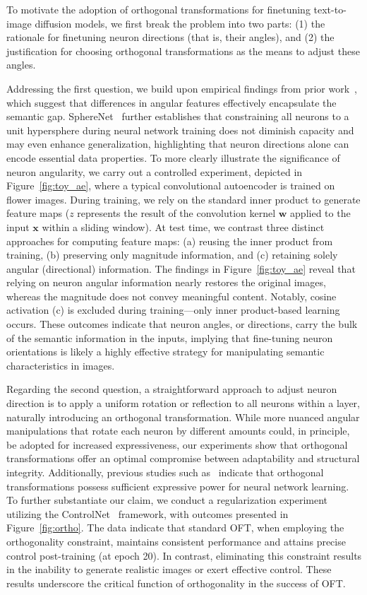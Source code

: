 To motivate the adoption of orthogonal transformations for finetuning text-to-image diffusion models, we first break the problem into two parts: (1) the rationale for finetuning neuron directions (that is, their angles), and (2) the justification for choosing orthogonal transformations as the means to adjust these angles.

Addressing the first question, we build upon empirical findings from prior work~\cite{liu2018decoupled,chen2020angular}, which suggest that differences in angular features effectively encapsulate the semantic gap. SphereNet~\cite{liu2017deep} further establishes that constraining all neurons to a unit hypersphere during neural network training does not diminish capacity and may even enhance generalization, highlighting that neuron directions alone can encode essential data properties. To more clearly illustrate the significance of neuron angularity, we carry out a controlled experiment, depicted in Figure~\ref{fig:toy_ae}, where a typical convolutional autoencoder is trained on flower images. During training, we rely on the standard inner product to generate feature maps ($z$ represents the result of the convolution kernel $\bm{w}$ applied to the input $\bm{x}$ within a sliding window). At test time, we contrast three distinct approaches for computing feature maps: (a) reusing the inner product from training, (b) preserving only magnitude information, and (c) retaining solely angular (directional) information. The findings in Figure~\ref{fig:toy_ae} reveal that relying on neuron angular information nearly restores the original images, whereas the magnitude does not convey meaningful content. Notably, cosine activation (c) is excluded during training—only inner product-based learning occurs. These outcomes indicate that neuron angles, or directions, carry the bulk of the semantic information in the inputs, implying that fine-tuning neuron orientations is likely a highly effective strategy for manipulating semantic characteristics in images.

Regarding the second question, a straightforward approach to adjust neuron direction is to apply a uniform rotation or reflection to all neurons within a layer, naturally introducing an orthogonal transformation. While more nuanced angular manipulations that rotate each neuron by different amounts could, in principle, be adopted for increased expressiveness, our experiments show that orthogonal transformations offer an optimal compromise between adaptability and structural integrity. Additionally, previous studies such as~\cite{liu2021orthogonal} indicate that orthogonal transformations possess sufficient expressive power for neural network learning. To further substantiate our claim, we conduct a regularization experiment utilizing the ControlNet~\cite{zhang2023adding} framework, with outcomes presented in Figure~\ref{fig:ortho}. The data indicate that standard OFT, when employing the orthogonality constraint, maintains consistent performance and attains precise control post-training (at epoch 20). In contrast, eliminating this constraint results in the inability to generate realistic images or exert effective control. These results underscore the critical function of orthogonality in the success of OFT.

